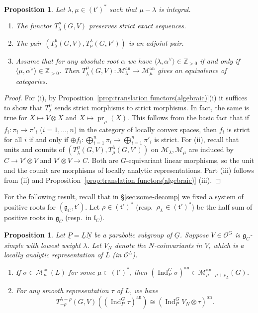 \documentclass[a4paper]{amsart}
\numberwithin{equation}{section}
\newtheorem{prop}[thm]{Proposition}
\theoremstyle{remark}
\theoremstyle{definition}
\DeclareMathOperator{\Ind}{Ind}
\DeclareMathOperator{\pr}{pr}
\newcommand{\Z}{\mathbb{Z}}
\newcommand{\alggrp}[1]{\underline{#1}}
\newcommand{\an}{\mathrm{an}}
\renewcommand{\simeq}{\cong}
\begin{document}
\begin{prop}\label{prop:translation functors(analytic)}
Let $\lambda,\mu\in (\mathfrak{t}')^{*}$ such that $\mu-\lambda$ is integral.
\begin{enumerate}
\item The functor $T_{\lambda}^{\mu}(G,V)$ preserves strict exact sequences.
\item The pair $(T_{\lambda}^{\mu}(G,V),T_{\mu}^{\lambda}(G,V'))$ is an adjoint pair.
\item Assume that for any absolute root $\alpha$ we have $\langle \lambda,\alpha^{\vee}\rangle \in\Z_{>0}$ if and only if $\langle\mu,\alpha^{\vee}\rangle \in\Z_{>0}$. Then $T_{\lambda}^{\mu}(G,V)\colon \mathcal{M}_{\lambda}^{\an}\to \mathcal{M}_{\mu}^{\an}$ gives an equivalence of categories.
\end{enumerate}
\end{prop}
\begin{proof}
For (i), by Proposition~\ref{prop:translation functors(algebraic)}(i) it suffices to show that $T_{\lambda}^{\mu}$ sends strict morphisms to strict morphisms.
In fact, the same is true for $X \mapsto V \otimes X$ and $X \mapsto \pr_{\mu}(X)$.
This follows from the basic fact that if $f_i \colon \pi_i \to \pi'_i$ ($i = 1,\dots,n$) in the category of locally convex spaces, then
$f_i$ is strict for all $i$ if and only if $\oplus f_i \colon \bigoplus_{i=1}^n \pi_i \to \bigoplus_{i=1}^n \pi'_i$ is strict.
For (ii), recall that units and counits of $(T_{\lambda}^{\mu}(G,V),T_{\mu}^{\lambda}(G,V'))$ on $\mathcal{M}_{\lambda},\mathcal{M}_{\mu}$ are induced by $C\to V'\otimes V$ and $V'\otimes V\to C$.
Both are $G$-equivariant linear morphisms, so the unit and the counit are morphisms of locally analytic representations.
Part (iii) follows from (ii) and Proposition~\ref{prop:translation functors(algebraic)} (iii).
\end{proof}

For the following result, recall that in \S\ref{sec:some-decomp} we fixed a system of positive roots for $(\mathfrak{g}_{C},\mathfrak{t}')$.
Let $\rho\in (\mathfrak{t}')^{*}$ (resp.\ $\rho_{L}\in (\mathfrak{t}')^{*}$) be the half sum of positive roots in $\mathfrak{g}_{C}$ (resp.\ in $\mathfrak{l}_{C}$).

\begin{prop}\label{prop:translation functors(parabolic induction)}
Let $\alggrp{P} = \alggrp{L}\alggrp{N}$ be a parabolic subgroup of $\alggrp{G}$.
Suppose $V \in \mathcal O^G$ is $\mathfrak{g}_{C}$-simple with lowest weight $\lambda$.
Let $V_N$ denote the $N$-coinvariants in $V$, which is a locally analytic representation of $L$ (in $\mathcal O^L$).
\begin{enumerate}
\item If $\sigma\in \mathcal{M}_{\mu}^{\an}(L)$ for some $\mu\in (\mathfrak{t}')^{*}$, then $(\Ind_{P}^{G}\sigma)^{\an}\in \mathcal{M}_{\mu - \rho + \rho_{L}}^{\an}(G)$.
\item For any smooth representation $\tau$ of $L$, we have
\[
T_{-\rho}^{\lambda - \rho}(G,V)((\Ind_{P}^{G}\tau)^{\an})\simeq (\Ind_{P}^{G}V_{N}\otimes \tau)^{\an}.
\]
\end{enumerate}
\end{prop}
\end{document}
